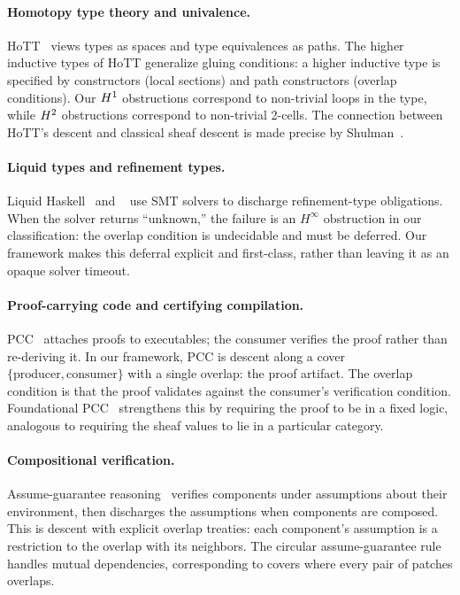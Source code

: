 \documentclass[11pt]{article}
\begin{document}
\paragraph{Homotopy type theory and univalence.}
HoTT~\cite{hottbook2013} views types as spaces and type equivalences as
paths.  The higher inductive types of HoTT generalize gluing conditions:
a higher inductive type is specified by constructors (local sections) and
path constructors (overlap conditions).  Our $H^{1}$ obstructions
correspond to non-trivial loops in the type, while $H^{2}$ obstructions
correspond to non-trivial 2-cells.  The connection between HoTT's descent
and classical sheaf descent is made precise by Shulman~\cite{shulman2015}.

\paragraph{Liquid types and refinement types.}
Liquid Haskell~\cite{vazou2014} and \Fstar{}~\cite{swamy2016} use SMT
solvers to discharge refinement-type obligations.  When the solver returns
``unknown,'' the failure is an $H^{\infty}$ obstruction in our
classification: the overlap condition is undecidable and must be deferred.
Our framework makes this deferral explicit and first-class, rather than
leaving it as an opaque solver timeout.

\paragraph{Proof-carrying code and certifying compilation.}
PCC~\cite{necula1997,necula2002} attaches proofs to executables; the
consumer verifies the proof rather than re-deriving it.  In our framework,
PCC is descent along a cover $\{\text{producer}, \text{consumer}\}$ with a
single overlap: the proof artifact.  The overlap condition is that the
proof validates against the consumer's verification condition.
Foundational PCC~\cite{appel2001} strengthens this by requiring the proof
to be in a fixed logic, analogous to requiring the sheaf values to lie in
a particular category.

\paragraph{Compositional verification.}
Assume-guarantee reasoning~\cite{jones1983,misra1981,pnueli1985} verifies
components under assumptions about their environment, then discharges the
assumptions when components are composed.  This is descent with explicit
overlap treaties: each component's assumption is a restriction to the
overlap with its neighbors.  The circular assume-guarantee
rule~\cite{namjoshi2007,alur1999} handles mutual dependencies, corresponding
to covers where every pair of patches overlaps.
\end{document}
